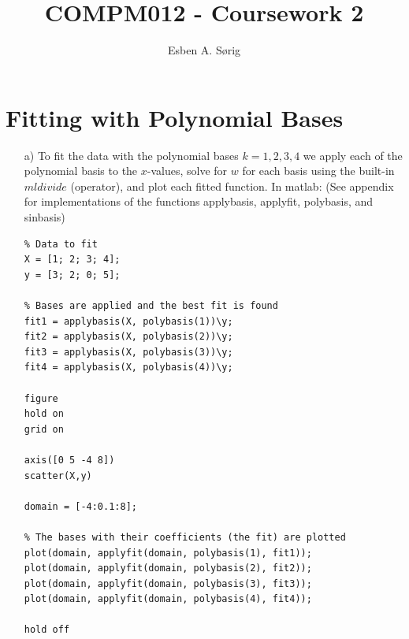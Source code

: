 \documentclass[11pt]{article}
\begin{document}
\lstset{language=Matlab}

\title{COMPM012 - Coursework 2}
\author{Esben A. S\o rig}

\maketitle

\section{Fitting with Polynomial Bases}
\begin{itemize}
    \item[a)]
        To fit the data with the polynomial bases $k=1,2,3,4$ we apply each of the polynomial basis to the $x$-values, solve for $w$ for each basis using the built-in $mldivide$ (\-operator), and plot each fitted function. In matlab: (See appendix for implementations of the functions applybasis, applyfit, polybasis, and sinbasis)
        \begin{lstlisting}
% Data to fit
X = [1; 2; 3; 4];
y = [3; 2; 0; 5];

% Bases are applied and the best fit is found
fit1 = applybasis(X, polybasis(1))\y;
fit2 = applybasis(X, polybasis(2))\y;
fit3 = applybasis(X, polybasis(3))\y;
fit4 = applybasis(X, polybasis(4))\y;

figure 
hold on
grid on

axis([0 5 -4 8])
scatter(X,y)

domain = [-4:0.1:8];

% The bases with their coefficients (the fit) are plotted
plot(domain, applyfit(domain, polybasis(1), fit1));
plot(domain, applyfit(domain, polybasis(2), fit2));
plot(domain, applyfit(domain, polybasis(3), fit3));
plot(domain, applyfit(domain, polybasis(4), fit4));

hold off
        \end{lstlisting}
        

\end{itemize}
\end{document}
